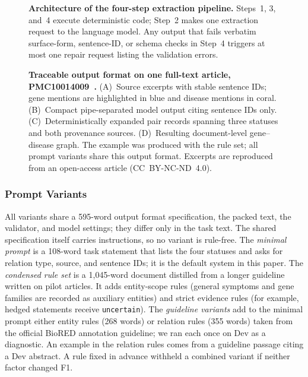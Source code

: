 \documentclass[preprint,10pt,letterpaper]{elsarticle}
\newcommand{\st}[1]{\texttt{#1}}             %
\begin{document}
\begin{figure}[!htbp]
\centering
\resizebox{\linewidth}{!}{}
\caption{\textbf{Architecture of the four-step extraction pipeline.} Steps~1, 3, and~4 execute deterministic code; Step~2 makes one extraction request to the language model. Any output that fails verbatim surface-form, sentence-ID, or schema checks in Step~4 triggers at most one repair request listing the validation errors.}
\label{fig:pipeline}
\end{figure}

\begin{figure}[!htbp]
\centering
\resizebox{\linewidth}{!}{}
\caption{\textbf{Traceable output format on one full-text article, PMC10014009~\cite{kim2023fccm}.} (A)~Source excerpts with stable sentence IDs; gene mentions are highlighted in blue and disease mentions in coral. (B)~Compact pipe-separated model output citing sentence IDs only. (C)~Deterministically expanded pair records spanning three statuses and both provenance sources. (D)~Resulting document-level gene--disease graph. The example was produced with the rule set; all prompt variants share this output format. Excerpts are reproduced from an open-access article (CC~BY-NC-ND~4.0).}
\label{fig:example}
\end{figure}

\subsubsection{Prompt Variants}
All variants share a 595-word output format specification, the packed text, the validator, and model settings; they differ only in the task text. The shared specification itself carries instructions, so no variant is rule-free. The \emph{minimal prompt} is a 108-word task statement that lists the four statuses and asks for relation type, source, and sentence IDs; it is the default system in this paper. The \emph{condensed rule set} is a 1,045-word document distilled from a longer guideline written on pilot articles. It adds entity-scope rules (general symptoms and gene families are recorded as auxiliary entities) and strict evidence rules (for example, hedged statements receive \st{uncertain}). The \emph{guideline variants} add to the minimal prompt either entity rules (268 words) or relation rules (355 words) taken from the official BioRED annotation guideline; we ran each once on Dev as a diagnostic. An example in the relation rules comes from a guideline passage citing a Dev abstract. A rule fixed in advance withheld a combined variant if neither factor changed F1.
\end{document}
